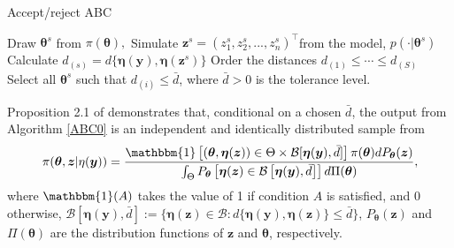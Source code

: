 \begin{algorithm}
	\caption{Accept/reject ABC}\label{ABC0}
	\begin{algorithmic}[1]
		\State Draw ${\boldsymbol {\theta} }^{s}$ from $\pi({ \boldsymbol{\theta} }),$
		\State Simulate ${\boldsymbol z}^{s}=(z_{1}^{s},z_{2}^{s},...,z_{n}^{s})^{\top}$from the model, $p(\cdot|{\boldsymbol{\theta} }^{s})$
		\State Calculate
		$d_{(s)}=d\{{\boldsymbol\eta }({\boldsymbol y}),{\boldsymbol \eta }({\boldsymbol z}^{s})\}$
		\EndFor
		\State Order the distances $d_{(1)}\leq\cdots\leq d_{(S)}$
		\State Select all $\boldsymbol{\theta}^s$ such that $d_{(i)}\leq \bar{d}$, where $\bar{d}>0$ is the tolerance level. 
	\end{algorithmic}
\end{algorithm}

Proposition 2.1 of \cite{biau2015} demonstrates that, conditional on a chosen $\bar{d}$, the output from Algorithm \ref{ABC0} is an independent and identically distributed sample from 
\begin{align*}
	\pi(\boldsymbol{\theta},{\boldsymbol z}|\eta(\boldsymbol{y}))=\frac{\mathbbm{1}\left[(\boldsymbol{\theta},\boldsymbol\eta({\boldsymbol z}))\in\Theta\times \mathcal{B}[\boldsymbol\eta({\boldsymbol y}),\bar{d}]\right]\pi(\boldsymbol{\theta})dP_{\boldsymbol{\theta}}(\boldsymbol{z})}{\int_{\Theta}P_{\boldsymbol{\theta}}\left[\boldsymbol\eta({\boldsymbol z})\in\mathcal{B}\left[\boldsymbol\eta({\boldsymbol y}),\bar{d}\right]\right]d\Pi(\boldsymbol{\theta})}, 
\end{align*}
where $\mathbbm{1}(A)$ takes the value of 1 if condition $A$ is satisfied, and 0 otherwise, $\mathcal{B}[\boldsymbol\eta({\boldsymbol y}),\bar d]:=\{\boldsymbol\eta({\boldsymbol z})\in\mathcal{B}:d\{\boldsymbol\eta({\boldsymbol y}),\boldsymbol\eta({\boldsymbol z})\}\leq \bar d\}$, $P_{\boldsymbol{\theta}}(\boldsymbol z)$ and $\Pi(\boldsymbol{\theta})$ are the distribution functions of $\boldsymbol z$ and $\boldsymbol \theta$, respectively.

